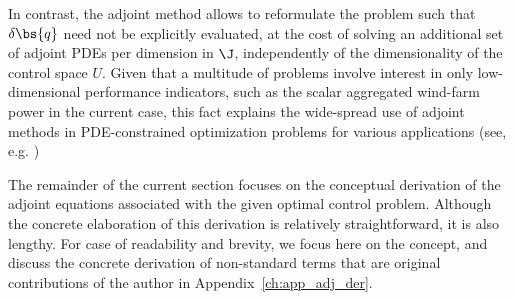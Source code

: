 	In contrast, the adjoint method allows to reformulate the problem such that $\delta \bs{q}$ need not be explicitly evaluated, at the cost of solving an additional set of adjoint PDEs per dimension in $\J$, independently of the dimensionality of the control space $U$. Given that a multitude of problems involve interest in  only low-dimensional performance indicators, such as  the scalar aggregated wind-farm power in the current case, this fact explains the wide-spread use of adjoint methods in PDE-constrained optimization problems for various applications (see, e.g. \cite{choi1999instantaneous, aage2008topology, dekeyser2014divertor})
	
	The remainder of the current section focuses on the conceptual derivation of the adjoint equations associated with the given optimal control problem. Although the concrete elaboration of this derivation is relatively straightforward, it is also lengthy. For case of readability and brevity, we focus here on the concept, and discuss the concrete derivation of non-standard terms that are original contributions of the author in Appendix~\ref{ch:app_adj_der}.


